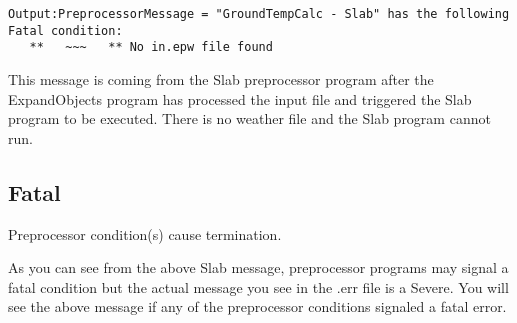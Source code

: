 \begin{lstlisting}
Output:PreprocessorMessage = "GroundTempCalc - Slab" has the following Fatal condition:
   **   ~~~   ** No in.epw file found
\end{lstlisting}

This message is coming from the Slab preprocessor program after the ExpandObjects program has processed the input file and triggered the Slab program to be executed. There is no weather file and the Slab program cannot run.

\subsection{Fatal}\label{fatal-000}

Preprocessor condition(s) cause termination.

As you can see from the above Slab message, preprocessor programs may signal a fatal condition but the actual message you see in the .err file is a Severe. You will see the above message if any of the preprocessor conditions signaled a fatal error.
